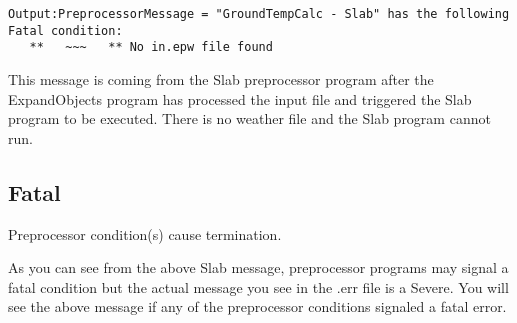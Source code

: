 \begin{lstlisting}
Output:PreprocessorMessage = "GroundTempCalc - Slab" has the following Fatal condition:
   **   ~~~   ** No in.epw file found
\end{lstlisting}

This message is coming from the Slab preprocessor program after the ExpandObjects program has processed the input file and triggered the Slab program to be executed. There is no weather file and the Slab program cannot run.

\subsection{Fatal}\label{fatal-000}

Preprocessor condition(s) cause termination.

As you can see from the above Slab message, preprocessor programs may signal a fatal condition but the actual message you see in the .err file is a Severe. You will see the above message if any of the preprocessor conditions signaled a fatal error.
